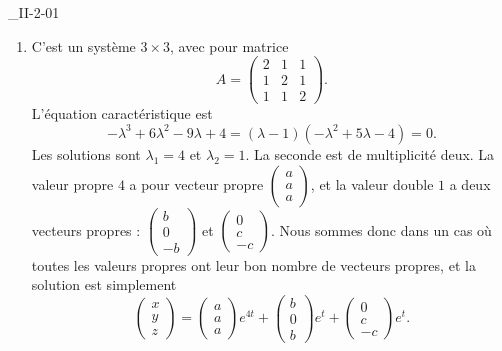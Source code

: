 \begin{corrige}{_II-2-01}
\begin{enumerate}
\begin{alternative}
\end{alternative}

\item
C'est un système $3\times 3$, avec pour matrice
\begin{equation}
	A=\begin{pmatrix}
  2	&	1	&	1\\ 
  1	&	2	&	1\\ 
 1	&	1	& 2	  
\end{pmatrix}.
\end{equation}
L'équation caractéristique est
\begin{equation}
	-\lambda^3+6\lambda^2-9\lambda+4=(\lambda-1)(-\lambda^2+5\lambda-4)=0.
\end{equation}
Les solutions sont $\lambda_1=4$ et $\lambda_2=1$. La seconde est de multiplicité deux. La valeur propre $4$ a pour vecteur propre $\begin{pmatrix}
	a	\\ 
	a	\\ 
	a	
\end{pmatrix}$, et la valeur double $1$ a deux vecteurs propres : $\begin{pmatrix}
	b	\\ 
	0	\\ 
	-b	
\end{pmatrix}$ et $\begin{pmatrix}
	0	\\ 
	c	\\ 
	-c	
\end{pmatrix}$. Nous sommes donc dans un cas où toutes les valeurs propres ont leur bon nombre de vecteurs propres, et la solution est simplement
\begin{equation}
	\begin{pmatrix}
	x	\\ 
	y	\\ 
	z	
\end{pmatrix}=\begin{pmatrix}
	a	\\ 
	a	\\ 
	a	
\end{pmatrix} e^{4t}
+\begin{pmatrix}
	b	\\ 
	0	\\ 
	b	
\end{pmatrix}e^t+\begin{pmatrix}
	0	\\ 
	c	\\ 
	-c	
\end{pmatrix}e^t.
\end{equation}


\end{enumerate}
\end{corrige}
